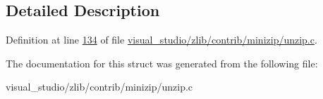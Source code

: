 \subsection{Detailed Description}


Definition at line \hyperlink{visual__studio_2zlib_2contrib_2minizip_2unzip_8c_source_l00134}{134} of file \hyperlink{visual__studio_2zlib_2contrib_2minizip_2unzip_8c_source}{visual\+\_\+studio/zlib/contrib/minizip/unzip.\+c}.



The documentation for this struct was generated from the following file\+:\begin{DoxyCompactItemize}
\item 
visual\+\_\+studio/zlib/contrib/minizip/unzip.\+c\end{DoxyCompactItemize}
